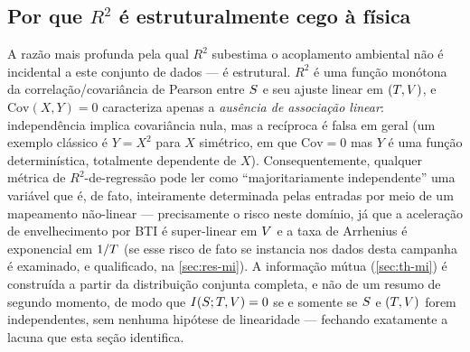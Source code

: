 \subsection{Por que $R^2$ é estruturalmente cego à física}
\label{sec:background-r2}
A razão mais profunda pela qual $R^2$ subestima o acoplamento ambiental não é
incidental a este conjunto de dados --- é estrutural. $R^2$ é uma função
monótona da correlação/covariância de Pearson entre $S$ e seu ajuste
linear em $(T,V)$, e $\mathrm{Cov}(X,Y)=0$ caracteriza apenas a
\emph{ausência de associação linear}: independência implica covariância
nula, mas a recíproca é falsa em geral (um exemplo clássico é $Y=X^2$ para
$X$ simétrico, em que $\mathrm{Cov}=0$ mas $Y$ é uma função determinística,
totalmente dependente de $X$). Consequentemente, qualquer métrica de
$R^2$-de-regressão pode ler como ``majoritariamente independente'' uma
variável que é, de fato, inteiramente determinada pelas entradas por meio de
um mapeamento não-linear --- precisamente o risco neste domínio, já que a
aceleração de envelhecimento por BTI é super-linear em $V$ e a taxa de
Arrhenius é exponencial em $1/T$ (se esse risco de fato se instancia nos
dados desta campanha é examinado, e qualificado, na \cref{sec:res-mi}). A informação mútua (\cref{sec:th-mi}) é
construída a partir da distribuição conjunta completa, e não de um resumo de
segundo momento, de modo que $I\!\left(S ; T,V\right)=0$ se e somente se
$S$ e $(T,V)$ forem independentes, sem nenhuma hipótese de
linearidade --- fechando exatamente a lacuna que esta seção identifica.
